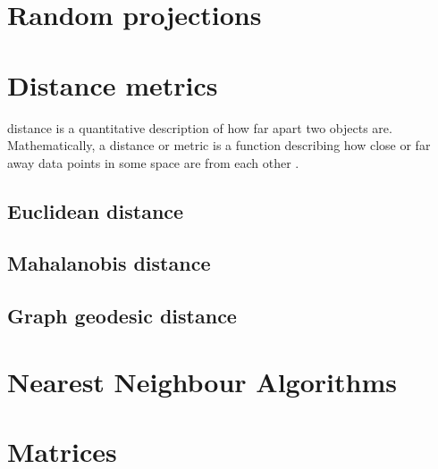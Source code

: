 \section{Random projections}

\section{Distance metrics}
\gls{distance} is a quantitative description of how far apart two objects are. 
Mathematically, a \gls{distance} or \gls{metric} is a function describing how 
close or far away data points in some space are from each other \cite{KHOA12}.

\subsection{Euclidean distance}

\subsection{Mahalanobis distance}

\subsection{Graph geodesic distance}

\section{Nearest Neighbour Algorithms}

\section{Matrices}

